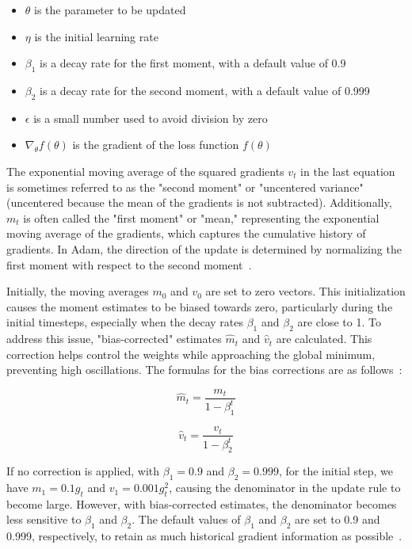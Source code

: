 \documentclass[12pt,a4paper]{report}
\begin{document}
\begin{itemize}
  \item \(\theta\) is the parameter to be updated
  \item \(\eta\) is the initial learning rate
  \item \(\beta_1\) is a decay rate for the first moment, with a default value of 0.9
  \item \(\beta_2\) is a decay rate for the second moment, with a default value of 0.999
  \item \(\epsilon\) is a small number used to avoid division by zero
  \item \(\nabla_\theta f(\theta)\) is the gradient of the loss function \(f(\theta)\)
\end{itemize}

The exponential moving average of the squared gradients \( v_t \) in the last equation is sometimes referred to as the "second moment" or "uncentered variance" (uncentered because the mean of the gradients is not subtracted). Additionally, \( m_t \) is often called the "first moment" or "mean," representing the exponential moving average of the gradients, which captures the cumulative history of gradients. In Adam, the direction of the update is determined by normalizing the first moment with respect to the second moment~\cite{adamoptimizerw}.

Initially, the moving averages \( m_0 \) and \( v_0 \) are set to zero vectors. This initialization causes the moment estimates to be biased towards zero, particularly during the initial timesteps, especially when the decay rates \( \beta_1 \) and \( \beta_2 \) are close to 1. To address this issue, "bias-corrected" estimates \( \hat{m}_t \) and \( \hat{v}_t \) are calculated. This correction helps control the weights while approaching the global minimum, preventing high oscillations. The formulas for the bias corrections are as follows~\cite{adamoptimizerw}:

\begin{equation}
  \hat{m}_t = \frac{m_t}{1 - \beta_1^t}
\end{equation}

\begin{equation}
  \hat{v}_t = \frac{v_t}{1 - \beta_2^t}
\end{equation}

If no correction is applied, with \(\beta_1 = 0.9\) and \(\beta_2 = 0.999\), for the initial step, we have \(m_1 = 0.1 g_t\) and \(v_1 = 0.001 g_t^2\), causing the denominator in the update rule to become large. However, with bias-corrected estimates, the denominator becomes less sensitive to \(\beta_1\) and \(\beta_2\). The default values of \(\beta_1\) and \(\beta_2\) are set to 0.9 and 0.999, respectively, to retain as much historical gradient information as possible~\cite{adamoptimizerw}.
\end{document}
